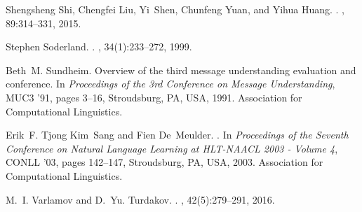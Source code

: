 \documentclass{nle}
\begin{document}
\begin{thebibliography}{}
Shengsheng Shi, Chengfei Liu, Yi~Shen, Chunfeng Yuan, and Yihua Huang.
.
, 89:314--331, 2015.

Stephen Soderland.
.
, 34(1):233--272, 1999.

Beth~M. Sundheim.
\newblock Overview of the third message understanding evaluation and
  conference.
\newblock In {\em Proceedings of the 3rd Conference on Message Understanding},
  MUC3 '91, pages 3--16, Stroudsburg, PA, USA, 1991. Association for
  Computational Linguistics.

Erik~F. Tjong Kim~Sang and Fien De~Meulder.
.
\newblock In {\em Proceedings of the Seventh Conference on Natural Language
  Learning at HLT-NAACL 2003 - Volume 4}, CONLL '03, pages 142--147,
  Stroudsburg, PA, USA, 2003. Association for Computational Linguistics.

M.~I. Varlamov and D.~Yu. Turdakov.
.
, 42(5):279--291, 2016.

\end{thebibliography}
\end{document}
